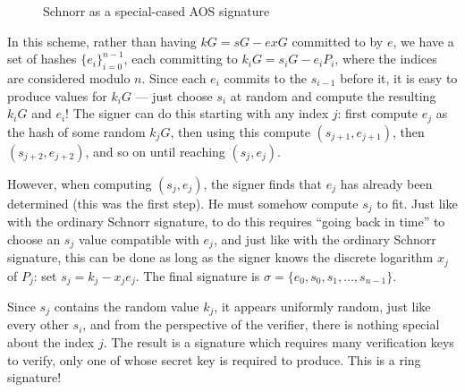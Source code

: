 \documentclass[letterpaper]{article}
\begin{document}
\begin{figure}\label{fig1}
\begin{center}
\end{center}
\caption{Schnorr as a special-cased AOS signature}
\end{figure}

In this scheme, rather than having $kG = sG - exG$ committed to by $e$, we
have a set of hashes $\{e_i\}_{i=0}^{n-1}$, each committing to $k_iG = s_iG
- e_iP_i$, where the indices are considered modulo $n$. Since each $e_i$ commits
to the $s_{i-1}$ before it, it is easy to produce values for $k_iG$ --- just
choose $s_i$ at random and compute the resulting $k_iG$ and $e_i$! The signer can
do this starting with any index $j$: first compute $e_j$ as the hash of some
random $k_jG$, then using this compute $(s_{j+1}, e_{j+1})$, then $(s_{j+2}, e_{j+2})$,
and so on until reaching $(s_j, e_j)$.

However, when computing $(s_j, e_j)$, the signer finds that $e_j$ has already
been determined (this was the first step). He must somehow compute $s_j$
to fit. Just like with the ordinary Schnorr signature, to do this requires ``going
back in time'' to choose an $s_j$ value compatible with $e_j$, and just
like with the ordinary Schnorr signature, this can be done as long as the signer
knows the discrete logarithm $x_j$ of $P_j$: set $s_j = k_j - x_je_j$. The
final signature is $\sigma = \{ e_0, s_0, s_1, \ldots, s_{n-1} \}$.

Since $s_j$ contains the random value $k_j$, it appears uniformly random, just
like every other $s_i$, and from the perspective of the verifier, there is nothing
special about the index $j$. The result is a signature which requires many verification
keys to verify, only one of whose secret key is required to produce. This is a ring
signature!
\end{document}
